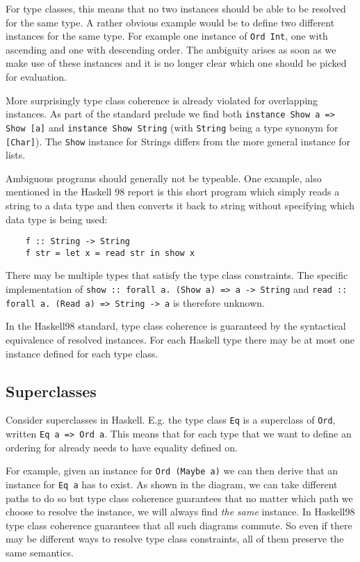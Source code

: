 For type classes, this means that no two instances should be able to be resolved for the same type.
A rather obvious example would be to define two different instances for the same type.
For example one instance of \texttt{Ord Int}, one with ascending and one with descending order.
The ambiguity arises as soon as we make use of these instances and it is no longer clear which one should be picked for evaluation.

More surprisingly type class coherence is already violated for overlapping instances.
As part of the standard prelude we find both \texttt{instance Show a => Show [a]} and \texttt{instance Show String}
(with \texttt{String} being a type synonym for \texttt{[Char]}).
The \texttt{Show} instance for Strings differs from the more general instance for lists.

Ambiguous programs should generally not be typeable.
One example, also mentioned in the Haskell 98 report \cite{Haskell98} is this short program which simply reads a string to a data type and then converts it back to string without specifying which data type is being used:

\begin{verbatim}
    f :: String -> String
    f str = let x = read str in show x
\end{verbatim}

There may be multiple types that satisfy the type class constraints.
The specific implementation of \texttt{show :: forall a. (Show a) => a -> String} and \texttt{read :: forall a. (Read a) => String -> a} is therefore unknown.

In the Haskell98 standard, type class coherence is guaranteed by the syntactical equivalence of resolved instances.
For each Haskell type there may be at most one instance defined for each type class.


\subsection{Superclasses}

Consider superclasses in Haskell.
E.g. the type class \texttt{Eq} is a superclass of \texttt{Ord}, written \texttt{Eq a => Ord a}.
This means that for each type that we want to define an ordering for already needs to have equality defined on.

For example, given an instance for \texttt{Ord (Maybe a)} we can then derive that an instance for \texttt{Eq a} has to exist.
As shown in the diagram, we can take different paths to do so but type class coherence guarantees that no matter which path we choose to resolve the instance, we will always find \emph{the same} instance.
In Haskell98 type class coherence guarantees that all such diagrams commute.
So even if there may be different ways to resolve type class constraints, all of them preserve the same semantics.

